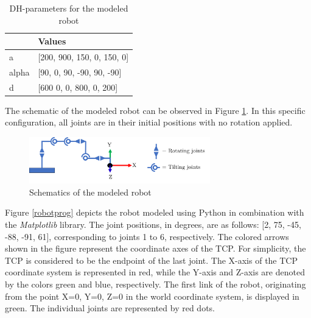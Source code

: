 \begin{table}[H]
	\centering
	\begin{tabular}{||l|l||}
		  & Values \\
		\hline
		\hline
		\hline
		a	&		[200, 900, 150, 0,   150, 0] \\
		alpha	&  	[90,  0,   90,  -90, 90,  -90] \\
		d	& 		[600  0,   0,   800, 0,   200]\\
		
		\hline
		\hline
	\end{tabular}
	
	\caption{DH-parameters for the modeled robot}
	\label{DHp}
\end{table}

The schematic of the modeled robot can be observed in Figure \ref{schema}. In this specific configuration, all joints are in their initial positions with no rotation applied.\newline

\begin{figure}[H]
	\centerline{\includegraphics[width=0.7\textwidth]{figures/schema.png}}
	\caption{Schematics of the modeled robot}
	\label{schema}
\end{figure}

Figure \ref{robotprog} depicts the robot modeled using Python in combination with the \textit{Matplotlib} library. The joint positions, in degrees, are as follows: [2, 75, -45, -88, -91, 61], corresponding to joints 1 to 6, respectively. The colored arrows shown in the figure represent the coordinate axes of the \acrshort{TCP}. For simplicity, the \acrshort{TCP} is considered to be the endpoint of the last joint. The X-axis of the \acrshort{TCP} coordinate system is represented in red, while the Y-axis and Z-axis are denoted by the colors green and blue, respectively. The first link of the robot, originating from the point X=0, Y=0, Z=0 in the world coordinate system, is displayed in green. The individual joints are represented by red dots.

\newpage

